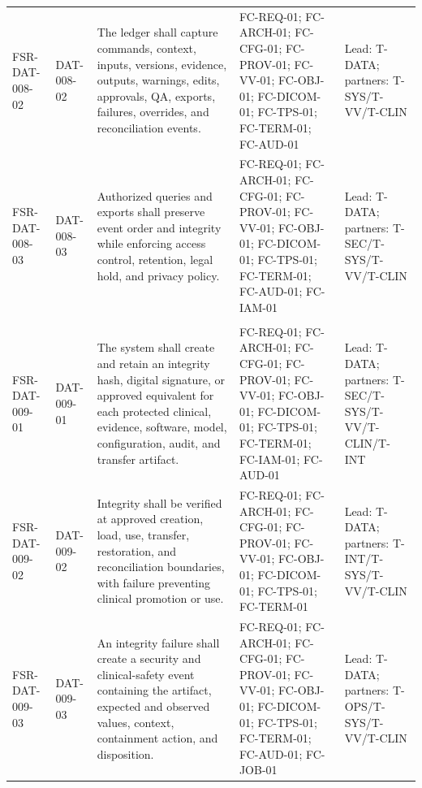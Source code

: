 \documentclass[11pt,letterpaper]{article}
\begin{document}
\begin{scriptsize}
\begin{longtable}{@{}L{0.16\textwidth}L{0.10\textwidth}L{0.31\textwidth}L{0.23\textwidth}L{0.125\textwidth}@{}}
\addlinespace[2pt]
\mbox{FSR-DAT-008-02} & \mbox{DAT-008-02} & The ledger shall capture commands, context, inputs, versions, evidence, outputs, warnings, edits, approvals, QA, exports, failures, overrides, and reconciliation events. & FC-REQ-01; FC-ARCH-01; FC-CFG-01; FC-PROV-01; FC-VV-01; FC-OBJ-01; FC-DICOM-01; FC-TPS-01; FC-TERM-01; FC-AUD-01 & Lead: T-DATA; partners: T-SYS\slash\allowbreak{}T-VV\slash\allowbreak{}T-CLIN \\
\addlinespace[2pt]
\mbox{FSR-DAT-008-03} & \mbox{DAT-008-03} & Authorized queries and exports shall preserve event order and integrity while enforcing access control, retention, legal hold, and privacy policy. & FC-REQ-01; FC-ARCH-01; FC-CFG-01; FC-PROV-01; FC-VV-01; FC-OBJ-01; FC-DICOM-01; FC-TPS-01; FC-TERM-01; FC-AUD-01; FC-IAM-01 & Lead: T-DATA; partners: T-SEC\slash\allowbreak{}T-SYS\slash\allowbreak{}T-VV\slash\allowbreak{}T-CLIN \\
\addlinespace[2pt]
 \\
\mbox{FSR-DAT-009-01} & \mbox{DAT-009-01} & The system shall create and retain an integrity hash, digital signature, or approved equivalent for each protected clinical, evidence, software, model, configuration, audit, and transfer artifact. & FC-REQ-01; FC-ARCH-01; FC-CFG-01; FC-PROV-01; FC-VV-01; FC-OBJ-01; FC-DICOM-01; FC-TPS-01; FC-TERM-01; FC-IAM-01; FC-AUD-01 & Lead: T-DATA; partners: T-SEC\slash\allowbreak{}T-SYS\slash\allowbreak{}T-VV\slash\allowbreak{}T-CLIN\slash\allowbreak{}T-INT \\
\addlinespace[2pt]
\mbox{FSR-DAT-009-02} & \mbox{DAT-009-02} & Integrity shall be verified at approved creation, load, use, transfer, restoration, and reconciliation boundaries, with failure preventing clinical promotion or use. & FC-REQ-01; FC-ARCH-01; FC-CFG-01; FC-PROV-01; FC-VV-01; FC-OBJ-01; FC-DICOM-01; FC-TPS-01; FC-TERM-01 & Lead: T-DATA; partners: T-INT\slash\allowbreak{}T-SYS\slash\allowbreak{}T-VV\slash\allowbreak{}T-CLIN \\
\addlinespace[2pt]
\mbox{FSR-DAT-009-03} & \mbox{DAT-009-03} & An integrity failure shall create a security and clinical-safety event containing the artifact, expected and observed values, context, containment action, and disposition. & FC-REQ-01; FC-ARCH-01; FC-CFG-01; FC-PROV-01; FC-VV-01; FC-OBJ-01; FC-DICOM-01; FC-TPS-01; FC-TERM-01; FC-AUD-01; FC-JOB-01 & Lead: T-DATA; partners: T-OPS\slash\allowbreak{}T-SYS\slash\allowbreak{}T-VV\slash\allowbreak{}T-CLIN \\

\end{longtable}
\end{scriptsize}
\end{document}
